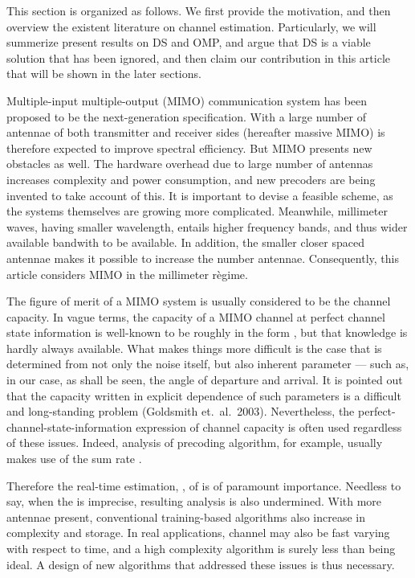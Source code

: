 \startchapter [title={Introduction}]

This section is organized as follows.
We first provide the motivation, and then overview the existent literature on channel estimation.
Particularly, we will summerize present results on DS and OMP, and argue that DS is a viable solution that has been ignored, and then claim our contribution in this article that will be shown in the later sections.

\stopsection

\startsection [title={Motivation of Compressed Channel Sensing}]

Multiple-input multiple-output (MIMO) communication system has been proposed to be the next-generation specification.
With a large number of antennae of both transmitter and receiver sides (hereafter massive MIMO) is therefore expected to improve spectral efficiency.
But MIMO presents new obstacles as well.
The hardware overhead due to large number of antennas increases complexity and power consumption, and new precoders are being invented to take account of this.
It is important to devise a feasible scheme, as the systems themselves are growing more complicated.
Meanwhile, millimeter waves, having smaller wavelength, entails higher frequency bands, and thus wider available bandwith to be available.
In addition, the smaller closer spaced antennae makes it possible to increase the number antennae.
Consequently, this article considers MIMO in the millimeter r\`egime.

The figure of merit of a MIMO system is usually considered to be the channel capacity.
In vague terms, the capacity  of a MIMO channel  at perfect channel state information is well-known to be roughly in the form , but that knowledge is hardly always available.
What makes things more difficult is the case that  is determined from not only the noise itself, but also inherent parameter --- such as, in our case, as shall be seen, the angle of departure and arrival.
It is pointed out that the capacity written in explicit dependence of such parameters is a difficult and long-standing problem (Goldsmith et.\ al.\ 2003).
Nevertheless, the perfect-channel-state-information expression of channel capacity is often used regardless of these issues.
Indeed, analysis of precoding algorithm, for example, usually makes use of the sum rate .

Therefore the real-time estimation, , of  is of paramount importance.
Needless to say, when the  is imprecise, resulting analysis is also undermined.
With more antennae present, conventional training-based algorithms also increase in complexity and storage.
In real applications, channel may also be fast varying with respect to time, and a high complexity algorithm is surely less than being ideal.
A design of new algorithms that addressed these issues is thus necessary.

